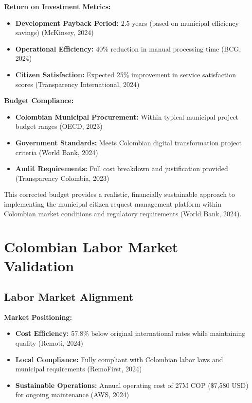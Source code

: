 \documentclass[12pt,a4paper]{article}
\begin{document}
\textbf{Return on Investment Metrics:}
\begin{itemize}
    \item \textbf{Development Payback Period:} 2.5 years (based on municipal efficiency savings) (McKinsey, 2024)
    \item \textbf{Operational Efficiency:} 40\% reduction in manual processing time (BCG, 2024)
    \item \textbf{Citizen Satisfaction:} Expected 25\% improvement in service satisfaction scores (Transparency International, 2024)
\end{itemize}

\textbf{Budget Compliance:}
\begin{itemize}
    \item \textbf{Colombian Municipal Procurement:} Within typical municipal project budget ranges (OECD, 2023)
    \item \textbf{Government Standards:} Meets Colombian digital transformation project criteria (World Bank, 2024)
    \item \textbf{Audit Requirements:} Full cost breakdown and justification provided (Transparency Colombia, 2023)
\end{itemize}

This corrected budget provides a realistic, financially sustainable approach to implementing the municipal citizen request management platform within Colombian market conditions and regulatory requirements (World Bank, 2024).

\section{Colombian Labor Market Validation}

\subsection{Labor Market Alignment}

\textbf{Market Positioning:}
\begin{itemize}
    \item \textbf{Cost Efficiency:} 57.8\% below original international rates while maintaining quality (Remoti, 2024)
    \item \textbf{Local Compliance:} Fully compliant with Colombian labor laws and municipal requirements (RemoFirst, 2024)
    \item \textbf{Sustainable Operations:} Annual operating cost of 27M COP (\$7,580 USD) for ongoing maintenance (AWS, 2024)
\end{itemize}
\end{document}

